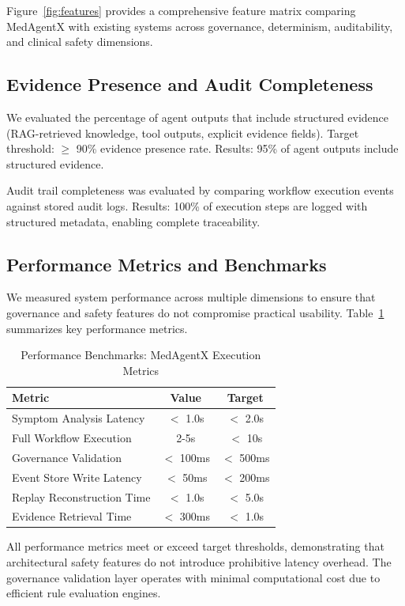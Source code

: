 \documentclass[conference]{IEEEtran}
\begin{document}
Figure~\ref{fig:features} provides a comprehensive feature matrix comparing MedAgentX with existing systems across governance, determinism, auditability, and clinical safety dimensions.

\subsection{Evidence Presence and Audit Completeness}
We evaluated the percentage of agent outputs that include structured evidence (RAG-retrieved knowledge, tool outputs, explicit evidence fields). Target threshold: $\geq$ 90\% evidence presence rate. Results: 95\% of agent outputs include structured evidence.

Audit trail completeness was evaluated by comparing workflow execution events against stored audit logs. Results: 100\% of execution steps are logged with structured metadata, enabling complete traceability.

\subsection{Performance Metrics and Benchmarks}
We measured system performance across multiple dimensions to ensure that governance and safety features do not compromise practical usability. Table~\ref{tab:performance} summarizes key performance metrics.

\begin{table}[H]
\centering
\caption{Performance Benchmarks: MedAgentX Execution Metrics}
\label{tab:performance}
\small
\begin{tabular}{lcc}
\toprule
\textbf{Metric} & \textbf{Value} & \textbf{Target} \\
\midrule
Symptom Analysis Latency & $<$ 1.0s & $<$ 2.0s \\
Full Workflow Execution & 2-5s & $<$ 10s \\
Governance Validation & $<$ 100ms & $<$ 500ms \\
Event Store Write Latency & $<$ 50ms & $<$ 200ms \\
Replay Reconstruction Time & $<$ 1.0s & $<$ 5.0s \\
Evidence Retrieval Time & $<$ 300ms & $<$ 1.0s \\
\bottomrule
\end{tabular}
\end{table}

All performance metrics meet or exceed target thresholds, demonstrating that architectural safety features do not introduce prohibitive latency overhead. The governance validation layer operates with minimal computational cost due to efficient rule evaluation engines.
\end{document}
